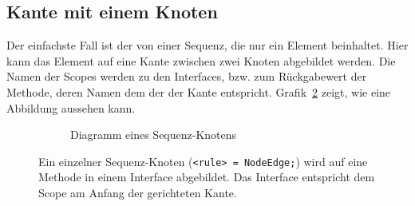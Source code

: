 \documentclass[../InterneDSLs.tex]{subfiles}
\begin{document}
\subsection{Kante mit einem Knoten}\label{SEC:OneNode}
Der einfachste Fall ist der von einer Sequenz, die nur ein Element beinhaltet. Hier kann das Element auf eine Kante zwischen zwei Knoten abgebildet werden. Die Namen der Scopes werden zu den Interfaces, bzw. zum Rückgabewert der Methode, deren Namen dem der der Kante entspricht. Grafik~\ref{FIG:OneElementNode} zeigt, wie eine Abbildung aussehen kann.
\begin{figure}[ht]
\centering
  \begin{subfigure}[c]{0.49\textwidth}
    \caption{Diagramm eines Sequenz-Knotens}
    \label{FIG:DiagramOneElementNode}
  \end{subfigure}
  \begin{subfigure}[c]{0.49\textwidth}
    
  \end{subfigure}
  \caption[Abbildung eines Sequenz-Knotens (\texttt{<rule> = NodeEdge;})]{Ein einzelner Sequenz-Knoten (\texttt{<rule> = NodeEdge;}) wird auf eine Methode in einem Interface abgebildet. Das Interface entspricht dem Scope am Anfang der gerichteten Kante.}
  \label{FIG:OneElementNode}
\end{figure}
\end{document}
